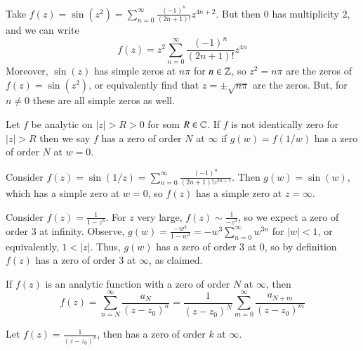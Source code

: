 \begin{example}
    Take $f(z) = \sin(z^2) = \sum\limits_{n=0}^{\infty}\frac{(-1)^n}{(2n+1)!}z^{4n+2}$. But then $0$ has multiplicity $2$, and we can write \begin{equation*}
        f(z) = z^2 \sum_{n=0}^{\infty}\frac{(-1)^n}{(2n+1)!}z^{4n}
    \end{equation*}
    Moreover, $\sin(z)$ has simple zeros at $n\pi$ for $n \in \mathbb Z$, so $z^2 = n\pi$ are the zeros of $f(z) = \sin(z^2)$, or equivalently find that $z = \pm\sqrt{n\pi}$ are the zeros. But, for $n \neq 0$ these are all simple zeros as well.
\end{example}

\begin{definition}
    Let $f$ be analytic on $|z| > R > 0$ for som $R \in \mathbb C$. If $f$ is not identically zero for $|z| > R$ then we say $f$ has a zero of order $N$ at $\infty$ if $g(w) = f(1/w)$ has a zero of order $N$ at $w = 0$.
\end{definition}


\begin{example}
    Consider $f(z) = \sin(1/z) = \sum_{n=0}^{\infty}\frac{(-1)^n}{(2n+1)!z^{2n+1}}$. Then $g(w) = \sin(w)$, which has a simple zero at $w = 0$, so $f(z)$ has a simple zero at $z = \infty$.
\end{example}


\begin{example}
    Consider $f(z) = \frac{1}{1-z^3}$. For $z$ very large, $f(z) \sim \frac{1}{-z^3}$, so we expect a zero of order $3$ at infinity. Observe, $g(w) = \frac{-w^3}{1-w^3} = -w^3\sum_{n=0}^{\infty}w^{3n}$ for $|w| < 1$, or equivalently, $1 < |z|$. Thus, $g(w)$ has a zero of order $3$ at $0$, so by definition $f(z)$ has a zero of order $3$ at $\infty$, as claimed.
\end{example}

\begin{theorem}
    If $f(z)$ is an analytic function with a zero of order $N$ at $\infty$, then \begin{equation*}
        f(z) = \sum_{n=N}^{\infty}\frac{a_N}{(z-z_0)^n} = \frac{1}{(z-z_0)^N}\sum_{m=0}^{\infty}\frac{a_{N+m}}{(z-z_0)^m}
    \end{equation*}
\end{theorem}

\begin{example}
    Let $f(z) = \frac{1}{(z-z_0)^k}$, then has a zero of order $k$ at $\infty$.
\end{example}


